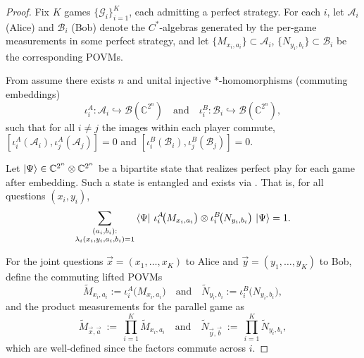 \documentclass[10pt,a4paper]{amsart}
\begin{document}
    \begin{proof}
    Fix $K$ games $\{\mathcal{G}_i\}_{i=1}^K$, each admitting a perfect strategy. For each $i$, let $\mathcal{A}_i$ (Alice) and $\mathcal{B}_i$ (Bob) denote the $C^*$-algebras generated by the per-game measurements in some perfect strategy, and let $\{M_{x_i,a_i}\}\subset\mathcal{A}_i$, $\{N_{y_i,b_i}\}\subset\mathcal{B}_i$ be the corresponding POVMs.

   From  assume there exists $n$ and unital injective $*$-homomorphisms (commuting embeddings)
    \begin{equation}
        \iota_i^A:\mathcal{A}_i\hookrightarrow \mathcal{B}(\mathbb{C}^{2^n}) \quad\text{and}\quad \iota_i^B:\mathcal{B}_i\hookrightarrow \mathcal{B}(\mathbb{C}^{2^n}),
    \end{equation}
    such that for all $i\neq j$ the images within each player commute,
    $[\iota_i^A(\mathcal{A}_i),\iota_j^A(\mathcal{A}_j)]=0$ and
    $[\iota_i^B(\mathcal{B}_i),\iota_j^B(\mathcal{B}_j)]=0$.
    
    Let $\ket{\Psi}\in\mathbb{C}^{2^n}\otimes\mathbb{C}^{2^n}$ be a bipartite state that realizes perfect play for each game after embedding. Such a state is entangled and exists via . That is, for all questions $(x_i,y_i)$,
    \begin{equation}\label{eq: embedded expectation}
    \sum_{\substack{(a_i,b_i):\\ \lambda_i(x_i,y_i,a_i,b_i)=1}}
    \bra{\Psi}\,\iota_i^A\!\big(M_{x_i,a_i}\big)\otimes
                 \iota_i^B\!\big(N_{y_i,b_i}\big)\,\ket{\Psi}=1.
    \end{equation}

    For the joint questions $\vec{x}=(x_1,\dots,x_K)$ to Alice and $\vec{y}=(y_1,\dots,y_K)$ to Bob, define the commuting lifted POVMs
    \begin{equation}
        \widetilde M_{x_i,a_i}:=\iota_i^A\!\big(M_{x_i,a_i}\big)\quad\text{and}\quad \widetilde N_{y_i,b_i}:=\iota_i^B\!\big(N_{y_i,b_i}\big),
    \end{equation}
    and the product measurements for the parallel game as 
    \begin{equation}
        \widetilde M_{\vec{x},\vec{a}}\ :=\ \prod_{i=1}^K \widetilde M_{x_i,a_i}\quad\text{and}\quad  \widetilde N_{\vec{y},\vec{b}}\ :=\ \prod_{i=1}^K \widetilde N_{y_i,b_i},
    \end{equation}
    which are well-defined since the factors commute across $i$.


\end{proof}
\end{document}
